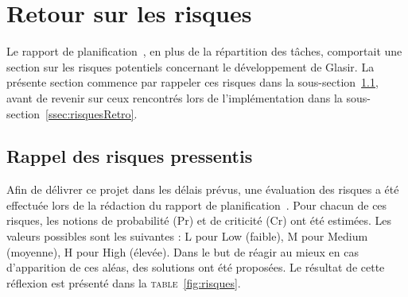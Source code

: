 \section{Retour sur les risques}
\label{sec:risques}

Le rapport de planification~\cite{planif}, en plus de la répartition des tâches, comportait une section sur les risques potentiels concernant le développement de Glasir. La présente section commence par rappeler ces risques dans la {\sc sous-section}~\ref{ssec:risquesBase}, avant de revenir sur ceux rencontrés lors de l'implémentation dans la {\sc sous-section}~\ref{ssec:risquesRetro}.

\subsection{Rappel des risques pressentis}
\label{ssec:risquesBase}

Afin de délivrer ce projet dans les délais prévus, une évaluation des risques a été effectuée lors de la rédaction du rapport de planification~\cite{planif}. Pour chacun de ces risques, les notions de probabilité (Pr) et de criticité (Cr) ont été estimées. Les valeurs possibles sont les suivantes : L pour \og Low \fg{} (faible), M pour \og Medium \fg{} (moyenne), H pour \og High \fg{} (élevée). Dans le but de réagir au mieux en cas d'apparition de ces aléas, des solutions ont été proposées. Le résultat de cette réflexion est présenté dans la \textsc{table}~\ref{fig:risques}. 

